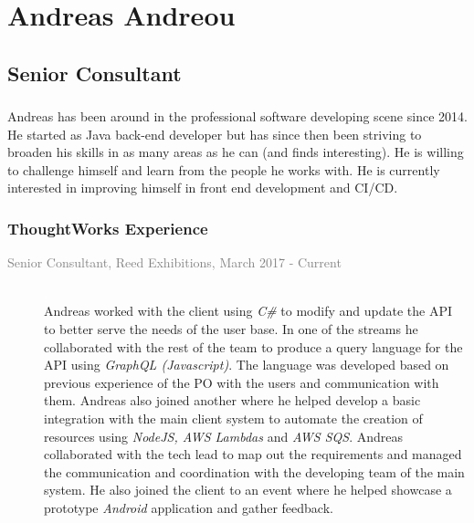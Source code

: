 \documentclass[12pt]{report}
\begin{document}
 
\chapter*{Andreas Andreou}
 
  \section*{Senior Consultant}
 
    \subsection*{}
    Andreas has been around in the professional software developing scene since 2014. He started as Java back-end developer but has since then been striving to broaden his skills in as many areas as he can (and finds interesting). He is willing to challenge himself and learn from the people he works with. He is currently interested in improving himself in front end development and CI/CD.

    \subsection*{ThoughtWorks Experience}
      \begin{description}
        \item[\textcolor{gray}{Senior Consultant, Reed Exhibitions, March 2017 - Current}]\textcolor{white}{.}\\
        Andreas worked with the client using \textit{C\#} to modify and update the API to better serve the needs of the user base. In one of the streams he collaborated with the rest of the team to produce a query language for the API using \textit{GraphQL (Javascript)}. The language was developed based on previous experience of the PO with the users and communication with them. Andreas also joined another where he helped develop a basic integration with the main client system to automate the creation of resources using \textit{NodeJS, AWS Lambdas} and \textit{AWS SQS}. Andreas collaborated with the tech lead to map out the requirements and managed the communication and coordination with the developing team of the main system. He also joined the client to an event where he helped showcase a prototype \textit{Android} application and gather feedback.
      \end{description}
    
\end{document}
